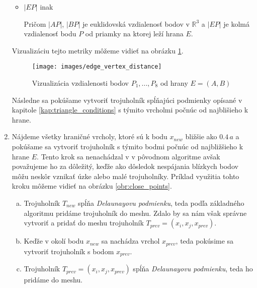 \begin{enumerate}
{\begin{definition}
\begin{itemize}
            \item{
                $|EP|$ inak
            }

            
            Pričom $|AP|$, $|BP|$ je euklidovská vzdialenosť bodov v $\mathbb{R}^3$ a $|EP|$ je kolmá 
            vzdialenosť bodu $P$ od priamky na ktorej leží hrana $E$.
        \end{itemize}

        \end{definition}

        Vizualizáciu tejto metriky môžeme vidieť na obrázku \ref{obr:edge_vertex_distance}.

        \begin{figure}
            \centerline{\texttt{[image: images/edge\_vertex\_distance]}}
            \caption[Vizualizácia vzdialenosti bodov $P_1, ..., P_8$ od hrany $E=(A,B)$]
            {Vizualizácia vzdialenosti bodov $P_1, ..., P_8$ od hrany $E=(A,B)$}
            \label{obr:edge_vertex_distance}
        \end{figure}


        Následne sa pokúšame vytvoriť trojuholník spĺňajúci podmienky opísané v kapitole 
        \ref{kap:triangle_conditions} s týmito vrcholmi počnúc od najblišieho k hrane.
    }
    \item{
        Nájdeme všetky hraničné vrcholy, ktoré sú k bodu $x_{new}$ bližšie ako $0.4 \, a$
        a pokúšame sa vytvoriť trojuholník s týmito bodmi počnúc od najbližšieho k hrane 
        $E$. Tento krok sa nenachádzal v v pôvodnom algoritme avšak považujeme ho za dôležitý, 
        keďže ako dôsledok nespájania blízkych bodov môžu neskôr vznikať úzke alebo malé trojuholníky. 
        Príklad využitia tohto kroku môžeme vidieť na obrázku \ref{obr:close_points}. 
        \begin{enumerate}[a)]
            \item{
                Trojuholník $T_{new}$ spĺňa \textit{Delaunayovu podmienku}, teda podľa základného 
                algoritmu pridáme trojuholník do meshu. Zdalo by sa nám však správne vytvoriť a 
                pridať do meshu trojuholník $T_{prev} = (x_i, x_j, x_{prev})$. 
            }
            \item{
                Keďže v okolí bodu $x_{new}$ sa nachádza vrchol $x_{prev}$, teda pokúsime
                sa vytvoriť trojuholník s bodom $x_{prev}.$
            }
            \item{
                Trojuholník $T_{prev} = (x_i, x_j, x_{prev})$ spĺňa \textit{Delaunayovu podmienku},
                teda ho pridáme do meshu. 
            }
        \end{enumerate}
        
}
\end{enumerate}
